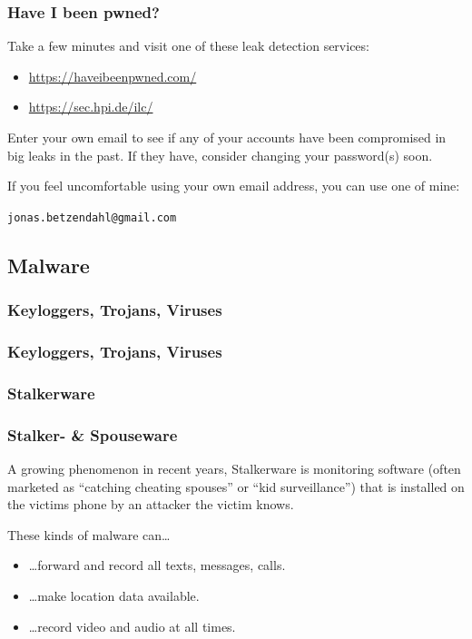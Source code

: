 \documentclass[aspectratio=169,dvipsnames]{beamer}
\begin{document}

\begin{frame}
\frametitle{Have I been pwned?}

Take a few minutes and visit one of these leak detection services:

\begin{itemize}
\item\url{https://haveibeenpwned.com/}
\item\url{https://sec.hpi.de/ilc/}
\end{itemize}
\bigskip

Enter your own email to see if any of your accounts have been compromised in big leaks in the past. If they have, consider changing your password(s) soon.
\bigskip\bigskip

If you feel uncomfortable using your own email address, you can use one of mine:
\begin{center}
\texttt{jonas.betzendahl@gmail.com}
\end{center}

\end{frame}


\subsection{Malware}

\subsubsection{Keyloggers, Trojans, Viruses}

\begin{frame}
\frametitle{Keyloggers, Trojans, Viruses}
\end{frame}

\subsubsection{Stalkerware}

\begin{frame}
\frametitle{Stalker- \& Spouseware}

A growing phenomenon in recent years, Stalkerware is monitoring software (often marketed as ``catching cheating spouses'' or ``kid surveillance'') that is installed on the victims phone by an attacker the victim knows.
\bigskip

These kinds of malware can\dots

\begin{itemize}
\item\dots forward and record all texts, messages, calls.
\item\dots make location data available.
\item\dots record video and audio at all times.
\end{itemize}

\end{frame}
\end{document}
